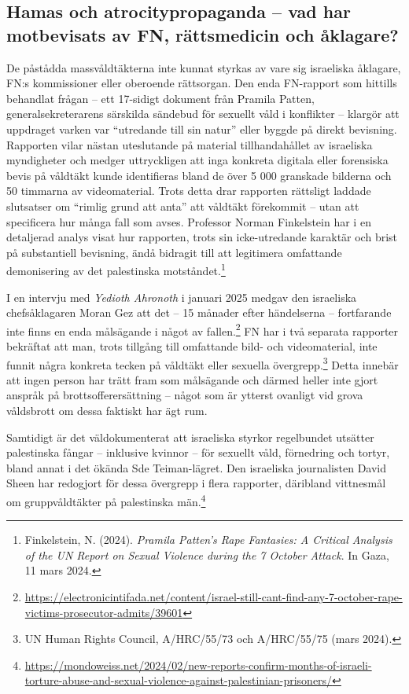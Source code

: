 \subsection{Hamas och atrocitypropaganda – vad har motbevisats av FN, rättsmedicin och åklagare?}

De påstådda massvåldtäkterna inte kunnat styrkas av vare sig israeliska åklagare, FN:s kommissioner eller oberoende rättsorgan. Den enda FN-rapport som hittills behandlat frågan – ett 17-sidigt dokument från Pramila Patten, generalsekreterarens särskilda sändebud för sexuellt våld i konflikter – klargör att uppdraget varken var \enquote{utredande till sin natur} eller byggde på direkt bevisning. Rapporten vilar nästan uteslutande på material tillhandahållet av israeliska myndigheter och medger uttryckligen att inga konkreta digitala eller forensiska bevis på våldtäkt kunde identifieras bland de över 5 000 granskade bilderna och 50 timmarna av videomaterial. Trots detta drar rapporten rättsligt laddade slutsatser om \enquote{rimlig grund att anta} att våldtäkt förekommit – utan att specificera hur många fall som avses. Professor Norman Finkelstein har i en detaljerad analys visat hur rapporten, trots sin icke-utredande karaktär och brist på substantiell bevisning, ändå bidragit till att legitimera omfattande demonisering av det palestinska motståndet.\footnote{Finkelstein, N. (2024). \textit{Pramila Patten’s Rape Fantasies: A Critical Analysis of the UN Report on Sexual Violence during the 7 October Attack}. In Gaza, 11 mars 2024.}

I en intervju med \textit{Yedioth Ahronoth} i januari 2025 medgav den israeliska chefsåklagaren Moran Gez att det – 15 månader efter händelserna – fortfarande inte finns en enda målsägande i något av fallen.\footnote{\url{https://electronicintifada.net/content/israel-still-cant-find-any-7-october-rape-victims-prosecutor-admits/39601}} FN har i två separata rapporter bekräftat att man, trots tillgång till omfattande bild- och videomaterial, inte funnit några konkreta tecken på våldtäkt eller sexuella övergrepp.\footnote{UN Human Rights Council, A/HRC/55/73 och A/HRC/55/75 (mars 2024).}
Detta innebär att ingen person har trätt fram som målsägande och därmed heller inte gjort anspråk på brottsofferersättning – något som är ytterst ovanligt vid grova våldsbrott om dessa faktiskt har ägt rum.

Samtidigt är det väldokumenterat att israeliska styrkor regelbundet utsätter palestinska fångar – inklusive kvinnor – för sexuellt våld, förnedring och tortyr, bland annat i det ökända Sde Teiman-lägret. Den israeliska journalisten David Sheen har redogjort för dessa övergrepp i flera rapporter, däribland vittnesmål om gruppvåldtäkter på palestinska män.\footnote{\url{https://mondoweiss.net/2024/02/new-reports-confirm-months-of-israeli-torture-abuse-and-sexual-violence-against-palestinian-prisoners/}}


